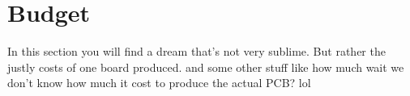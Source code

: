 \section{Budget}
In this section you will find a dream that's not very sublime.
But rather the justly costs of one board produced.
and some other stuff
like how much wait we don't know how much it cost to produce the actual PCB?
lol
